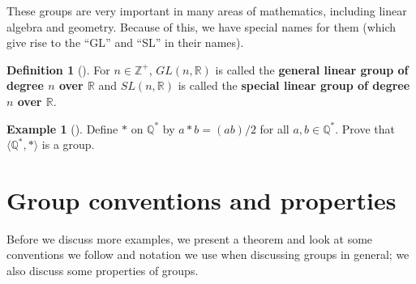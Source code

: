 \documentclass[10pt,]{book}
\newcommand{\terminology}[1]{\textbf{#1}}
\theoremstyle{plain}
\theoremstyle{definition}
\newtheorem{definition}[theorem]{Definition}
\theoremstyle{definition}
\theoremstyle{definition}
\newtheorem{example}[theorem]{Example}
\theoremstyle{definition}
\numberwithin{equation}{section}
\def\Z{\mathbb{Z}}
\def\R{\mathbb{R}}
\def\Q{\mathbb{Q}}
\begin{document}
These groups are very important in many areas of mathematics, including linear algebra and geometry. Because of this, we have special names for them (which give rise to the ``GL'' and ``SL'' in their names).%
\begin{definition}[{}]\label{definition-20}
For \(n\in \Z^+\), \(GL(n,\R)\) is called the \terminology{general linear group of degree \(n\) over \(\R\)} and \(SL(n,\R)\) is called the \terminology{special linear group of degree \(n\) over \(\R\)}.%
\end{definition}
\begin{example}[]\label{example-12}
Define \(*\) on \(\Q^*\) by \(a*b=(ab)/2\) for all \(a,b\in \Q^*\). Prove that \(\langle \Q^*,*\rangle\) is a group.%
\end{example}
\typeout{************************************************}
\typeout{************************************************}
\section[{Group conventions and properties}]{Group conventions and properties}\label{section-7}
Before we discuss more examples, we present a theorem and look at some conventions we follow and notation we use when discussing groups in general; we also discuss some properties of groups.%
\typeout{************************************************}
\typeout{************************************************}
\end{document}
